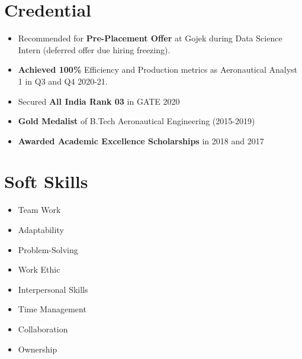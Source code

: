\documentclass[letterpaper,11pt]{article}
\begin{document}
\section{Credential}
    \begin{multicols}{2}
            \begin{itemize}[itemsep=-5pt, parsep=8pt]
                \item 
                \small
                Recommended for \textbf{Pre-Placement Offer} at Gojek during Data Science Intern (deferred offer due hiring freezing).
                \item \textbf{Achieved {100\%}} Efficiency and Production metrics as Aeronautical Analyst 1 in Q3 and Q4 2020-21.
                \item Secured \textbf{All India Rank 03} in GATE 2020
                \item \textbf{Gold Medalist} of B.Tech Aeronautical Engineering (2015-2019)
                \item \textbf{Awarded Academic Excellence Scholarships} in 2018 and 2017
            \end{itemize}
        \end{multicols}
        \vspace*{2.0\multicolsep}

\section{Soft Skills}
    \begin{multicols}{4}
            \begin{itemize}[itemsep=-5pt, parsep=8pt]
                \item Team Work  
                \item Adaptability
                \item Problem-Solving
                \item Work Ethic
                \item Interpersonal Skills
                \item Time Management
                \item Collaboration
                \item Ownership
            \end{itemize}
        \end{multicols}
        \vspace*{2.0\multicolsep}
\end{document}
